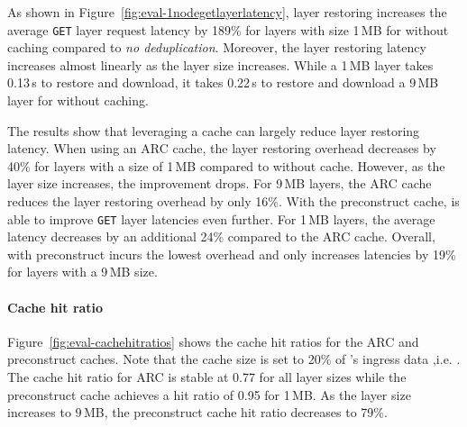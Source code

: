 %
As shown in Figure~\ref{fig:eval-1nodegetlayerlatency}, 
layer restoring increases the average \texttt{GET} layer request latency by 189\% for layers 
with size 1\,MB for \sysname without caching compared to \emph{no deduplication}.
%
Moreover, the layer restoring latency increases almost linearly as the layer size increases.
%
While a 1\,MB layer takes 0.13\,s to restore and download, 
it takes 0.22\,s to restore and download a 9\,MB
layer for \sysname without caching.

%
The results show that
leveraging a cache can largely reduce layer restoring latency.
%
When using an ARC cache, the layer restoring overhead decreases by 40\% for layers with
a size of 1\,MB compared to \sysname without cache.
%
However, as the layer size increases,  the improvement drops.
%
For 9\,MB layers, the ARC cache reduces the layer restoring overhead by only 16\%.
%
%
With the preconstruct cache, \sysname is able to improve \texttt{GET} layer latencies even further.
%
For 1\,MB layers, the average latency decreases by an additional 24\% compared to the ARC cache.
%
Overall, \sysname with preconstruct incurs the lowest overhead and only increases latencies by
19\% for layers with a 9\,MB size. 

\paragraph{Cache hit ratio}
%
Figure~\ref{fig:eval-cachehitratios} shows the cache hit ratios for the ARC and
preconstruct caches.
%
Note that the cache size is set to 20\% of \dal{}'s ingress data ,i.e. \gap.
%
%
The cache hit ratio for ARC is stable at 0.77 for all layer sizes while
the preconstruct cache achieves a hit ratio of 0.95 for 1\,MB.
%
As the layer size increases to 9\,MB, the preconstruct cache hit ratio decreases to 79\%.

